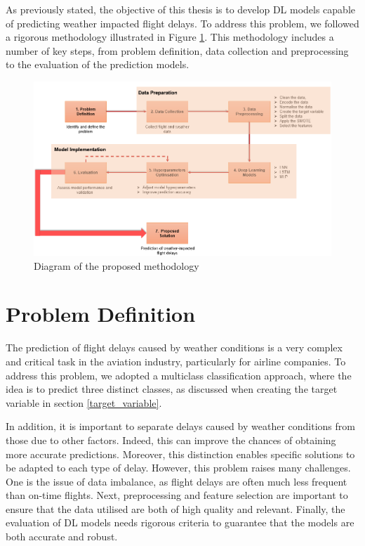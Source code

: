\documentclass[12pt,oneside]{book} %
\begin{document}
\noindent As previously stated, the objective of this thesis is to develop DL models capable of predicting weather impacted flight delays. To address this problem, we followed a rigorous methodology illustrated in Figure \ref{fig:proposed_methodology}. This methodology includes a number of key steps, from problem definition, data collection and preprocessing to the evaluation of the prediction models.

\begin{figure}[H]
    \includegraphics[width=1.03\linewidth]{Image/methodology.png}
    \caption{Diagram of the proposed methodology}
    \label{fig:proposed_methodology}
\end{figure}

\section{Problem Definition}
\label{problem_definition}

\noindent The prediction of flight delays caused by weather conditions is a very complex and critical task in the aviation industry, particularly for airline companies. To address this problem, we adopted a multiclass classification approach, where the idea is to predict three distinct classes, as discussed when creating the target variable in section \ref{target_variable}.

\noindent In addition, it is important to separate delays caused by weather conditions from those due to other factors. Indeed, this can improve the chances of obtaining more accurate predictions. Moreover, this distinction enables specific solutions to be adapted to each type of delay. However, this problem raises many challenges. One is the issue of data imbalance, as flight delays are often much less frequent than on-time flights. Next, preprocessing and feature selection are important to ensure that the data utilised are both of high quality and relevant. Finally, the evaluation of DL models needs rigorous criteria to guarantee that the models are both accurate and robust.
\end{document}

